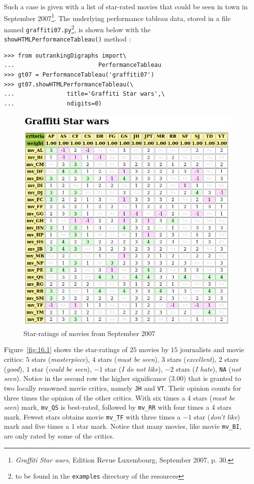 Such a case is given with a list of star-rated movies that could be seen in town in September 2007\footnote{\emph{Graffiti Star wars}, Edition Revue Luxembourg, September 2007, p. 30.}. The underlying performance tableau data, stored in a file named \texttt{graffiti07.py}\footnote{to be found in the \texttt{examples} directory of the \Digraph resources}, is shown below with the \texttt{showHTMLPerformance\-Tableau()} method  : 
\begin{lstlisting}
>>> from outrankingDigraphs import\
...                        PerformanceTableau 
>>> gt07 = PerformanceTableau('graffiti07')
>>> gt07.showHTMLPerformanceTableau(\
...               title='Graffiti Star wars',\
...               ndigits=0)
\end{lstlisting}
\begin{figure}[ht]
\includegraphics[width=\hsize]{Figures/16-1-graffiti07_1.png}
\caption{Star-ratings of movies from September 2007}
\label{fig:16.1}       %
\end{figure}

Figure~\vref{fig:16.1} shows the star-ratings of $25$ movies by $15$ journalists and movie critics: $5$ stars (\emph{masterpiece}), $4$ stars (\emph{must be seen}), $3$ stars (\emph{excellent}), $2$ stars (\emph{good}), $1$ star (\emph{could be seen}), $-1$ star (\emph{I do not like}), $-2$ stars (\emph{I hate}), \texttt{NA} (\emph{not seen}). Notice in the second row the higher significance ($3.00$) that is granted to two locally renowned movie critics, namely \texttt{JH} and \texttt{VT}. Their opinion counts for three times the opinion of the other critics. With six times a 4 stars (\emph{must be seen}) mark, \texttt{mv\_QS} is best-rated, followed by \texttt{mv\_RR} with four times a 4 stars mark. Fewest stars obtains movie \texttt{mv\_TF} with three times a $-1$ star (\emph{don't like}) mark and five times a $1$ star mark. Notice that many movies, like movie \texttt{mv\_BI}, are only rated by some of the critics. 

